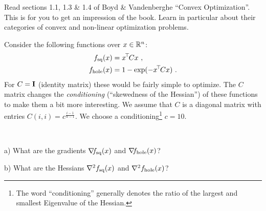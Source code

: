 

\renewcommand{\course}{Optimization}
\renewcommand{\coursepicture}{optim}
\renewcommand{\coursedate}{Summer 2015}
\renewcommand{\exnum}{1}

\exercises



Read sections 1.1, 1.3 \& 1.4 of Boyd \& Vandenberghe ``Convex
Optimization''. This is for you to get an impression of the
book. Learn in particular about their categories of convex and
non-linear optimization problems.



Consider the following functions over $x\in{\mathbb{R}}^n$:
\begin{align}
f_\text{sq}(x)
 &= x^{\!\top\!} C x ~,\\
f_\text{hole}(x)
 &= 1-\exp(-x^{\!\top\!} C x) ~.
\end{align}
For $C={\rm\bf I}$ (identity matrix) these would be fairly simple to
optimize. The $C$ matrix changes the \emph{conditioning} (``skewedness
of the Hessian'') of these functions to make them a bit more
interesting. We assume that $C$ is a diagonal matrix with entries $C(i,i) =
c^{\frac{i-1}{n-1}}$. We choose a conditioning\footnote{The
word ``conditioning'' generally denotes the ratio of the largest and
smallest Eigenvalue of the Hessian.} $c=10$.

~

a) What are the gradients ${\nabla_{\!\!}} f_{\text{sq}}(x)$ and
${\nabla_{\!\!}} f_{\text{hole}}(x)$?

b) What are the Hessians ${\nabla_{\!\!}^2} f_{\text{sq}}(x)$ and
${\nabla_{\!\!}^2} f_{\text{hole}}(x)$?

